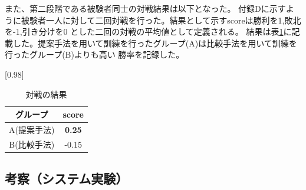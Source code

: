 \begin{table}[H]
    \caption{先読み手数制限なしの場合}
    \scriptsize
    \centering
    \label{table:system-100}
\end{table}
また、第二段階である被験者同士の対戦結果は以下となった。
付録Dに示すように被験者一人に対して二回対戦を行った。結果として示すscoreは勝利を1,敗北を-1,引き分けを0
とした二回の対戦の平均値として定義される。
結果は表\ref{table:result-battle}に記載した。提案手法を用いて訓練を行ったグループ(A)は比較手法を用いて訓練を行ったグループ(B)よりも高い
勝率を記録した。
\begin{table}[H]
	\caption{対戦の結果}
	\centering
	\scalebox{0.98}[0.98]{
		\begin{tabular}{c|c}
			グループ & score \\ \hline
			A(提案手法)    & \bf{0.25} \\ 
			B(比較手法)    & -0.15 \\
		\end{tabular}
	}
	\label{table:result-battle}
\end{table}
\subsection{考察（システム実験）}

